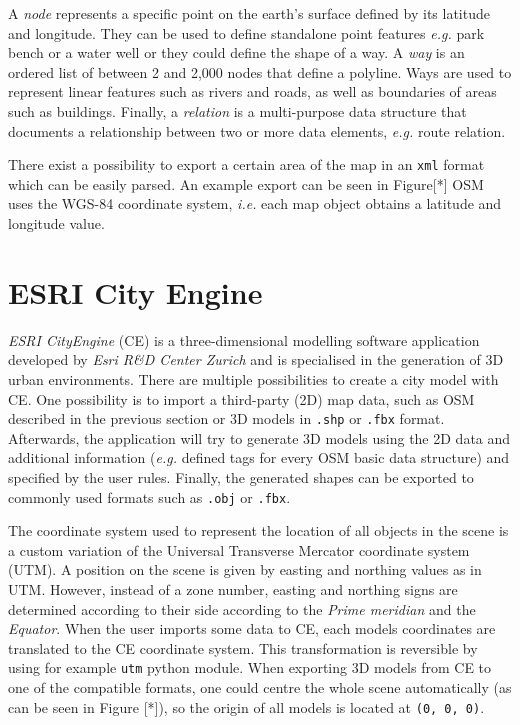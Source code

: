 A \emph{node} represents a specific point on the earth's surface defined by its latitude and longitude. They can be used to define standalone point features \emph{e.g.} park bench or a water well or they could define the shape of a way. A \emph{way} is an ordered list of between 2 and 2,000 nodes that define a polyline. Ways are used to represent linear features such as rivers and roads, as well as boundaries of areas such as buildings. Finally, a \emph{relation} is a multi-purpose data structure that documents a relationship between two or more data elements, \emph{e.g.} route relation.

There exist a possibility to export a certain area of the map in an \texttt{xml} format which can be easily parsed. An example export can be seen in Figure[*] OSM uses the WGS-84 coordinate system, \emph{i.e.} each map object obtains a latitude and longitude value. 

\section{ESRI City Engine}
\label{ch:ce}
\emph{ESRI CityEngine} (CE) is a three-dimensional modelling software application developed by \emph{Esri R\&D Center Zurich} and is specialised in the generation of 3D urban environments. There are multiple possibilities to create a city model with CE. One possibility is to import a third-party (2D) map data, such as OSM described in the previous section or 3D models in \texttt{.shp} or \texttt{.fbx} format. Afterwards, the application will try to generate 3D models using the 2D data and additional information (\emph{e.g.} defined tags for every OSM basic data structure) and specified by the user rules. Finally, the generated shapes can be exported to commonly used formats such as \texttt{.obj} or \texttt{.fbx}. 

The coordinate system used to represent the location of all objects in the scene is a custom variation of the Universal Transverse Mercator coordinate system (UTM). A position on the scene is given by easting and northing values as in UTM. However, instead of a zone number, easting and northing signs are determined according to their side according to the \emph{Prime meridian} and the \emph{Equator}\cite{ceman}. When the user imports some data to CE, each models coordinates are translated to the CE coordinate system. This transformation is reversible by using for example \texttt{utm}\cite{utm} python module. When exporting 3D models from CE to one of the compatible formats, one could centre the whole scene automatically (as can be seen in Figure [*]), so the origin of all models is located at \texttt{(0, 0, 0)}.

